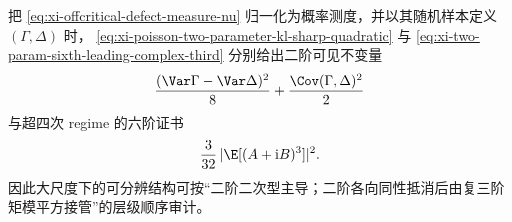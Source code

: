 \begin{remark}\label{rem:xi-poisson-two-parameter-defect-measure-fusion}
把 \eqref{eq:xi-offcritical-defect-measure-nu} 归一化为概率测度，并以其随机样本定义 \((\Gamma,\Delta)\) 时，
\eqref{eq:xi-poisson-two-parameter-kl-sharp-quadratic}
与 \eqref{eq:xi-two-param-sixth-leading-complex-third}
分别给出二阶可见不变量
\[
\frac{(\Var\Gamma-\Var\Delta)^2}{8}
+\frac{\Cov(\Gamma,\Delta)^2}{2}
\]
与超四次 regime 的六阶证书
\[
\frac{3}{32}\,|\E[(A+\mathrm{i}B)^3]|^2.
\]
因此大尺度下的可分辨结构可按“二阶二次型主导；二阶各向同性抵消后由复三阶矩模平方接管”的层级顺序审计。
\end{remark}

\endinput
